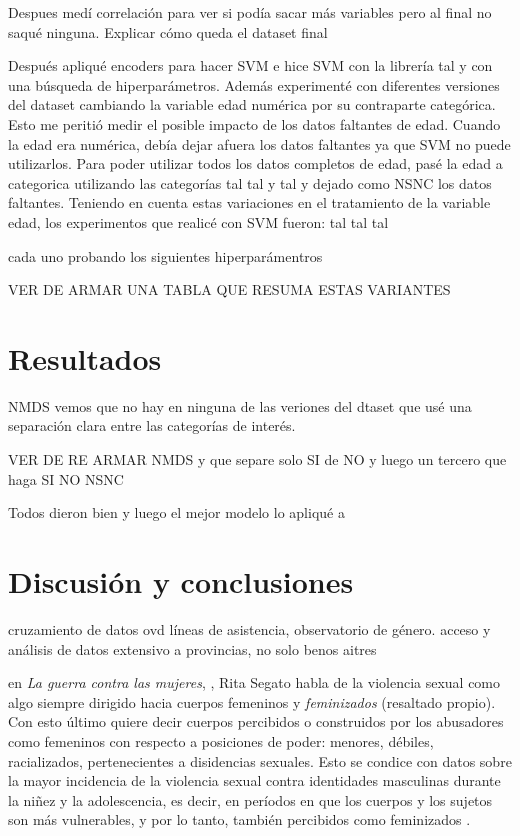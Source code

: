 \documentclass[10 pt]{article}
\begin{document}
Despues medí correlación para ver si podía sacar más variables pero al final no saqué ninguna. Explicar cómo queda el dataset final

Después apliqué encoders para hacer SVM e hice SVM con la librería tal y con una búsqueda de hiperparámetros. Además experimenté con diferentes versiones del dataset cambiando la variable edad numérica por su contraparte categórica. Esto me peritió medir el posible impacto de los datos faltantes de edad. Cuando la edad era numérica, debía dejar afuera los datos faltantes ya que SVM no puede utilizarlos. Para poder utilizar todos los datos completos de edad, pasé la edad a categorica  utilizando las categorías tal tal y tal y dejado como NSNC los datos faltantes. Teniendo en cuenta estas variaciones en el tratamiento de la variable edad, los experimentos que realicé con SVM fueron: 
tal tal tal

cada uno probando los siguientes hiperparámentros

VER DE ARMAR UNA TABLA QUE RESUMA ESTAS VARIANTES 


\section*{Resultados}\label{resultados}
NMDS vemos que no hay en ninguna de las veriones del dtaset que usé una separación clara entre las categorías de interés.

VER DE RE ARMAR NMDS y que separe solo SI de NO y luego un tercero que haga SI NO NSNC

Todos dieron bien y luego el mejor modelo lo apliqué a 

\section*{Discusión y conclusiones}\label{conc}
cruzamiento de datos ovd líneas de asistencia, observatorio de género.
acceso y análisis de datos extensivo a provincias, no solo benos aitres


en \textit{La guerra contra las mujeres}, \citeyearpar{segato2016guerra}, Rita Segato habla de la violencia sexual como algo siempre dirigido hacia cuerpos femeninos y \textit{feminizados} (resaltado propio). Con esto último quiere decir cuerpos percibidos o construidos por los abusadores como femeninos con respecto a posiciones de poder: menores, débiles, racializados, pertenecientes a disidencias sexuales. Esto se condice con datos sobre la mayor incidencia de la violencia sexual contra identidades masculinas durante la niñez y la adolescencia, es decir, en períodos en que los cuerpos y los sujetos son más vulnerables, y por lo tanto, también percibidos como feminizados \citep*{contreras2016violencia,ufem_relevamiento,ferris2002world}.
\end{document}
